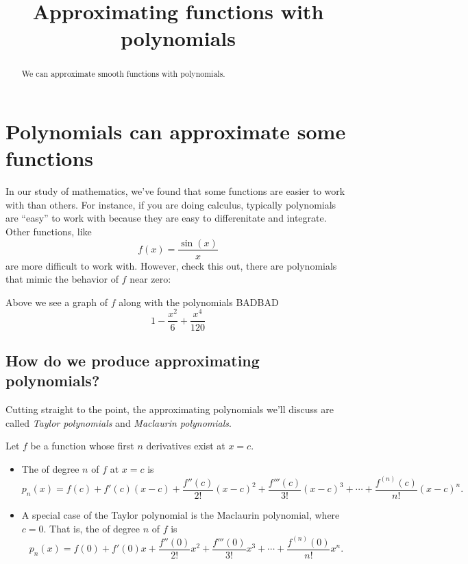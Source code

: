 \documentclass{ximera}
\title[Dig-In:]{Approximating functions with polynomials}
\begin{document}
\begin{abstract}
We can approximate smooth functions with polynomials.
\end{abstract}
\maketitle


\section{Polynomials can approximate some functions}

In our study of mathematics, we've found that some functions are
easier to work with than others. For instance, if you are doing
calculus, typically polynomials are ``easy'' to work with because they
are easy to differenitate and integrate. Other functions, like
\[
f(x) = \frac{\sin(x)}{x}
\]
are more difficult to work with. However, check this out, there are
polynomials that mimic the behavior of $f$ near zero:

Above we see a graph of $f$ along with the polynomials BADBAD
\[
1-\frac{x^2}{6}+\frac{x^4}{120}
\]

\subsection{How do we produce approximating polynomials?}

Cutting straight to the point, the approximating polynomials we'll
discuss are called \textit{Taylor polynomials} and \textit{Maclaurin
  polynomials}.

\begin{definition}
  Let $f$ be a function whose first $n$ derivatives exist at $x=c$.
  \begin{itemize}
  \item The  of degree $n$ of $f$ at $x=c$ is
    \[
    p_n(x) = f(c) + f'(c)(x-c) + \frac{f''(c)}{2!}(x-c)^2+\frac{f'''(c)}{3!}(x-c)^3+\cdots+\frac{f^{(n)}(c)}{n!}(x-c)^n.
    \]
  \item A special case of the Taylor polynomial is the Maclaurin
    polynomial, where $c=0$. That is, the 
    of degree $n$ of $f$ is
    \[
    p_n(x) = f(0) + f'(0)x +\frac{f''(0)}{2!}x^2+\frac{f'''(0)}{3!}x^3+\cdots+\frac{f^{(n)}(0)}{n!}x^n.
    \]
\end{itemize}
\end{definition}
\end{document}
